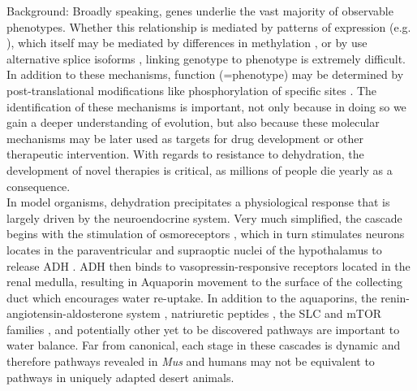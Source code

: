 \documentclass[11pt]{article}
\begin{document}
Background: Broadly speaking, genes underlie the vast majority of observable phenotypes. Whether this relationship is mediated by patterns of expression (e.g. \cite{Teets:2012gt}), which itself may be mediated by differences in methylation \citep{Brenet:2011dq}, or by use alternative splice isoforms \citep{Yukutake:2010ia}, linking genotype to phenotype is extremely difficult. In addition to these mechanisms, function (=phenotype) may be determined by post-translational modifications like phosphorylation of specific sites \citep{Moeller:2009gb}. The identification of these mechanisms is important, not only because in doing so we gain a deeper understanding of evolution, but also because these molecular mechanisms may be later used as targets for drug development or other therapeutic intervention. With regards to resistance to dehydration, the development of novel therapies is critical, as millions of people die yearly as a consequence. \\

In model organisms, dehydration precipitates a physiological response that is largely driven by the neuroendocrine system. Very much simplified, the cascade begins with the stimulation of osmoreceptors \citep{Arsenijevic:1985bi}, which in turn stimulates neurons locates in the paraventricular and supraoptic nuclei of the hypothalamus to release ADH \citep{Zingg:1986vb}. ADH then binds to vasopressin-responsive receptors located in the renal medulla, resulting in Aquaporin movement to the surface of the collecting duct \citep{Nielsen:1995uq} which encourages water re-uptake. In addition to the aquaporins, the renin-angiotensin-aldosterone system \citep{Gubler:2010bh}, natriuretic peptides \citep{Totsune:1994kf}, the SLC and mTOR families \citep{Ortells:2012go}, and potentially other yet to be discovered pathways are important to water balance. Far from canonical, each stage in these cascades is dynamic and therefore pathways revealed in \textit{Mus} and humans may not be equivalent to pathways in uniquely adapted desert animals.\\
\end{document}
